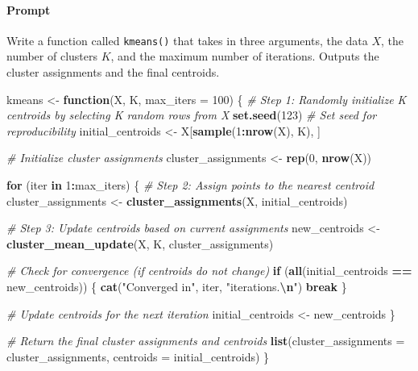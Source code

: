 \documentclass[
]{article}
\newenvironment{Shaded}{\begin{snugshade}}{\end{snugshade}}
\newcommand{\AttributeTok}[1]{\textcolor[rgb]{0.13,0.29,0.53}{#1}}
\newcommand{\CommentTok}[1]{\textcolor[rgb]{0.56,0.35,0.01}{\textit{#1}}}
\newcommand{\ControlFlowTok}[1]{\textcolor[rgb]{0.13,0.29,0.53}{\textbf{#1}}}
\newcommand{\DecValTok}[1]{\textcolor[rgb]{0.00,0.00,0.81}{#1}}
\newcommand{\FunctionTok}[1]{\textcolor[rgb]{0.13,0.29,0.53}{\textbf{#1}}}
\newcommand{\NormalTok}[1]{#1}
\newcommand{\OtherTok}[1]{\textcolor[rgb]{0.56,0.35,0.01}{#1}}
\newcommand{\SpecialCharTok}[1]{\textcolor[rgb]{0.81,0.36,0.00}{\textbf{#1}}}
\newcommand{\StringTok}[1]{\textcolor[rgb]{0.31,0.60,0.02}{#1}}
\begin{document}
\hypertarget{prompt-2}{%
\paragraph{Prompt}\label{prompt-2}}

Write a function called \texttt{kmeans()} that takes in three arguments,
the data \(X\), the number of clusters \(K\), and the maximum number of
iterations. Outputs the cluster assignments and the final centroids.

\begin{Shaded}
\begin{Highlighting}[]
\NormalTok{kmeans }\OtherTok{\textless{}{-}} \ControlFlowTok{function}\NormalTok{(X, K, }\AttributeTok{max\_iters =} \DecValTok{100}\NormalTok{) \{}
  \CommentTok{\# Step 1: Randomly initialize K centroids by selecting K random rows from X}
  \FunctionTok{set.seed}\NormalTok{(}\DecValTok{123}\NormalTok{)  }\CommentTok{\# Set seed for reproducibility}
\NormalTok{  initial\_centroids }\OtherTok{\textless{}{-}}\NormalTok{ X[}\FunctionTok{sample}\NormalTok{(}\DecValTok{1}\SpecialCharTok{:}\FunctionTok{nrow}\NormalTok{(X), K), ]}
  
  \CommentTok{\# Initialize cluster assignments}
\NormalTok{  cluster\_assignments }\OtherTok{\textless{}{-}} \FunctionTok{rep}\NormalTok{(}\DecValTok{0}\NormalTok{, }\FunctionTok{nrow}\NormalTok{(X))}
  
  \ControlFlowTok{for}\NormalTok{ (iter }\ControlFlowTok{in} \DecValTok{1}\SpecialCharTok{:}\NormalTok{max\_iters) \{}
    \CommentTok{\# Step 2: Assign points to the nearest centroid}
\NormalTok{    cluster\_assignments }\OtherTok{\textless{}{-}} \FunctionTok{cluster\_assignments}\NormalTok{(X, initial\_centroids)}
    
    \CommentTok{\# Step 3: Update centroids based on current assignments}
\NormalTok{    new\_centroids }\OtherTok{\textless{}{-}} \FunctionTok{cluster\_mean\_update}\NormalTok{(X, K, cluster\_assignments)}
    
    \CommentTok{\# Check for convergence (if centroids do not change)}
    \ControlFlowTok{if}\NormalTok{ (}\FunctionTok{all}\NormalTok{(initial\_centroids }\SpecialCharTok{==}\NormalTok{ new\_centroids)) \{}
      \FunctionTok{cat}\NormalTok{(}\StringTok{"Converged in"}\NormalTok{, iter, }\StringTok{"iterations.}\SpecialCharTok{\textbackslash{}n}\StringTok{"}\NormalTok{)}
      \ControlFlowTok{break}
\NormalTok{    \}}
    
    \CommentTok{\# Update centroids for the next iteration}
\NormalTok{    initial\_centroids }\OtherTok{\textless{}{-}}\NormalTok{ new\_centroids}
\NormalTok{  \}}
  
  \CommentTok{\# Return the final cluster assignments and centroids}
  \FunctionTok{list}\NormalTok{(}\AttributeTok{cluster\_assignments =}\NormalTok{ cluster\_assignments, }\AttributeTok{centroids =}\NormalTok{ initial\_centroids)}
\NormalTok{\}}
\end{Highlighting}
\end{Shaded}
\end{document}
